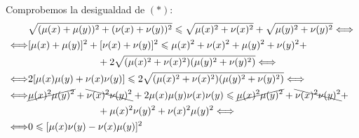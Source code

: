\begin{ejercicio}
\begin{enumerate}
\begin{itemize}
                Comprobemos la desigualdad de $(\ast)$:
                \begin{equation*}
                    \begin{split}
                        & \sqrt{(\mu (x) + \mu(y))^2 + (\nu (x) + \nu(y))^2} \leq \sqrt{\mu (x)^{2} + \nu(x)^2} + \sqrt{\mu (y)^{2} + \nu(y)^2} \Longleftrightarrow \\
                        \Longleftrightarrow &  [\mu (x) + \mu(y)]^2 + [\nu (x) + \nu(y)]^2 \leq \mu (x)^{2} + \nu(x)^2 + \mu (y)^{2} + \nu(y)^2 + \\&\hspace{2.5cm} + 2\sqrt{(\mu (x)^{2} + \nu(x)^2)(\mu (y)^{2} + \nu(y)^2)}
                        \Longleftrightarrow \\
                        \Longleftrightarrow & 2[\mu(x)\mu(y) + \nu(x)\nu(y)] \leq 2\sqrt{(\mu (x)^{2} + \nu(x)^2)(\mu (y)^{2} + \nu(y)^2)} \Longleftrightarrow \\
                        \Longleftrightarrow & \cancel{\mu(x)^2\mu(y)^2} + \bcancel{\nu(x)^2\nu(y)^2} +2\mu(x)\mu(y)\nu(x)\nu(y) \leq \cancel{\mu(x)^2\mu(y)^2} + \bcancel{\nu(x)^2\nu(y)^2} + \\&\hspace{2.5cm} + \mu(x)^2\nu(y)^2 +\nu(x)^2\mu(y)^2 \Longleftrightarrow \\
                        \Longleftrightarrow & 0\leq [\mu(x)\nu(y) - \nu(x)\mu(y)]^2
                    \end{split}
                \end{equation*}
            \end{itemize}
    \end{enumerate}
\end{ejercicio}

